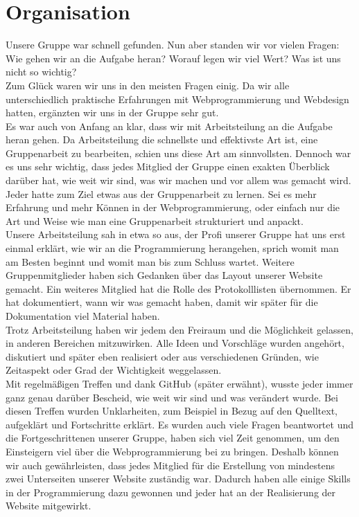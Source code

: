 \documentclass[12pt,a4paper]{article}
\begin{document}
\section{Organisation}
Unsere Gruppe war schnell gefunden. Nun aber standen wir vor vielen Fragen: Wie gehen wir an die Aufgabe heran? Worauf legen wir viel Wert? Was ist uns nicht so wichtig?\\ 
Zum Glück waren wir uns in den meisten Fragen einig. Da wir alle unterschiedlich praktische Erfahrungen mit Webprogrammierung und Webdesign hatten, ergänzten wir uns in der Gruppe sehr gut. \\
Es war auch von Anfang an klar, dass wir mit Arbeitsteilung an die Aufgabe heran gehen. Da Arbeitsteilung die schnellste und effektivste Art ist, eine Gruppenarbeit zu bearbeiten, schien uns diese Art am sinnvollsten. Dennoch war es uns sehr wichtig, dass jedes Mitglied der Gruppe einen exakten Überblick darüber hat, wie weit wir sind, was wir machen und vor allem was gemacht wird. Jeder hatte zum Ziel etwas aus der Gruppenarbeit zu lernen. Sei es mehr Erfahrung und mehr Können in der Webprogrammierung, oder einfach nur die Art und Weise wie man eine Gruppenarbeit strukturiert und anpackt. \\
Unsere Arbeitsteilung sah in etwa so aus, der Profi unserer Gruppe hat uns erst einmal erklärt, wie wir an die Programmierung herangehen, sprich womit man am Besten beginnt und womit man bis zum Schluss wartet. Weitere Gruppenmitglieder haben sich Gedanken über das Layout unserer Website gemacht. Ein weiteres Mitglied hat die Rolle des Protokolllisten übernommen. Er hat dokumentiert, wann wir was gemacht haben, damit wir später für die Dokumentation viel Material haben. \\
Trotz Arbeitsteilung haben wir jedem den Freiraum und die Möglichkeit gelassen, in anderen Bereichen mitzuwirken. Alle Ideen und Vorschläge wurden angehört, diskutiert und später eben realisiert oder aus verschiedenen Gründen, wie Zeitaspekt oder Grad der Wichtigkeit weggelassen. \\
Mit regelmäßigen Treffen und dank GitHub (später erwähnt), wusste jeder immer ganz genau darüber Bescheid, wie weit wir sind und was verändert wurde. Bei diesen Treffen wurden Unklarheiten, zum Beispiel in Bezug auf den Quelltext, aufgeklärt und Fortschritte erklärt. Es wurden auch viele Fragen beantwortet und die Fortgeschrittenen unserer Gruppe, haben sich viel Zeit genommen, um den Einsteigern viel über die Webprogrammierung bei zu bringen. Deshalb können wir auch gewährleisten, dass jedes Mitglied für die Erstellung von mindestens zwei Unterseiten unserer Website zuständig war. Dadurch haben alle einige Skills in der Programmierung dazu gewonnen und jeder hat an der Realisierung der Website mitgewirkt.\\
\end{document}
